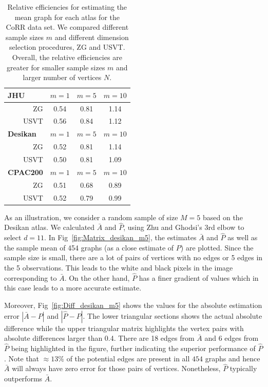 \documentclass[10pt,letterpaper]{article}
\begin{document}
\begin{table}[!htb]
    \caption{Relative efficiencies for estimating the mean graph for each atlas for the CoRR data set. We compared different sample sizes $m$ and different dimension selection procedures, ZG and USVT. Overall, the relative efficiencies are greater for smaller sample sizes $m$ and larger number of vertices $N$. } 
    \label{tab:corr_re}
    \centering

\begin{tabular}{rccc}\toprule
\multicolumn{1}{l}{\textbf{JHU}} & $m=1$  & $m=5$  & $m=10$  \\\midrule
ZG      & 0.54 & 0.81 & 1.14 \\
USVT    & 0.56 & 0.84 & 1.12 \\\midrule
\multicolumn{1}{l}{\textbf{Desikan}} & $m=1$  & $m=5$  & $m=10$  \\ \midrule
ZG      & 0.52 & 0.81 & 1.14 \\
USVT    & 0.50 & 0.81 & 1.09 \\\midrule
\multicolumn{1}{l}{\textbf{CPAC200}} & $m=1$  & $m=5$  & $m=10$  \\\midrule
ZG      & 0.51 & 0.68 & 0.89 \\
USVT    & 0.52 & 0.79 & 0.99 \\\bottomrule
\end{tabular}
\end{table}



As an illustration, we consider a random sample of size $M=5$ based on the Desikan atlas.
We calculated $\bar{A}$ and $\hat{P}$, using  Zhu and Ghodsi's 3rd elbow to select $d=11$. 
In Fig~\ref{fig:Matrix_desikan_m5}, the estimates $\bar{A}$ and $\hat{P}$ as well as the sample mean of 454 graphs (as a close estimate of $P$) are plotted. 
Since the sample size is small, there are a lot of pairs of vertices with no edges or 5 edges in the 5 observations.
This leads to the white and black pixels in the image corresponding to $\bar{A}$.
On the other hand, $\hat{P}$ has a finer gradient of values which in this case leads to a more accurate estimate.

Moreover, Fig~\ref{fig:Diff_desikan_m5} shows the values for the absolute estimation error $|\bar{A} - P|$ and $|\hat{P}-P|$. The lower triangular sections shows the actual absolute difference while the upper triangular matrix highlights the vertex pairs with absolute differences larger than 0.4. 
There are 18 edges from $\bar{A}$ and 6 edges from $\hat{P}$ being highlighted in the figure, further indicating the superior performance of $\hat{P}$.
Note that $\approx 13\%$ of the potential edges are present in all $454$ graphs and hence $\bar{A}$ will always have zero error for those pairs of vertices.
Nonetheless, $\hat{P}$ typically outperforms $\bar{A}$.
\end{document}
